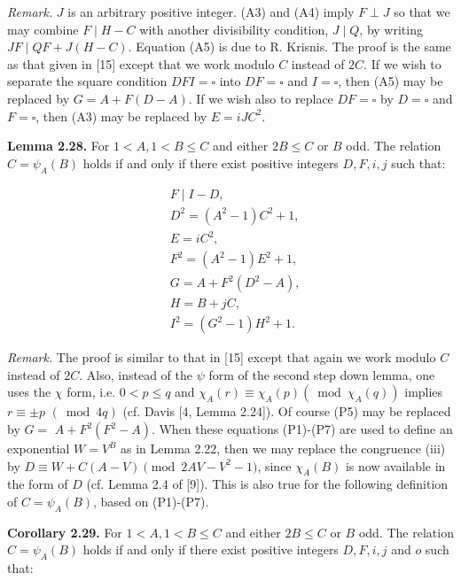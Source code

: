 \documentclass[11pt,a4paper]{article}
\newcommand{\origpage}[1]{\marginnote{\footnotesize\textbf{[#1]}}}
\begin{document}
\noindent\emph{Remark.} $J$ is an arbitrary positive integer. (A3) and (A4) imply $F \perp J$ so that we may combine $F \mid H-C$ with another divisibility condition, $J \mid Q$, by writing $J F \mid Q F+J(H-C)$. Equation (A5) is due to R. Krisnis. The proof is the same as that given in [15] except that we work modulo $C$ instead of $2 C$. If we wish to separate the square condition $D F I=\square$ into $D F=\square$ and $I=\square$, then (A5) may be replaced by $G=A+F(D-A)$. If we wish also to replace $D F=\square$ by $D=\square$ and $F=\square$, then (A3) may be replaced by $E=i J C^{2}$.

\noindent\textbf{Lemma 2.28.}\origpage{560} For $1<A,\allowbreak  1<B \leq C$ and either $2 B \leq C$ or $B$ odd. The relation $C=\psi_{A}(B)$ holds if and only if there exist positive integers $D,\allowbreak  F,\allowbreak  i,\allowbreak  j$ such that:


\begin{align*}
& F \mid I-D,  \tag{P1}\\
& D^{2}=\left(A^{2}-1\right) C^{2}+1,  \tag{P2}\\
& E=i C^{2},  \tag{P3}\\
& F^{2}=\left(A^{2}-1\right) E^{2}+1,  \tag{P4}\\
& G=A+F^{2}\left(D^{2}-A\right),  \tag{P5}\\
& H=B+j C,  \tag{P6}\\
& I^{2}=\left(G^{2}-1\right) H^{2}+1 . \tag{P7}
\end{align*}


\noindent\emph{Remark.} The proof is similar to that in [15] except that again we work modulo $C$ instead of $2 C$. Also, instead of the $\psi$ form of the second step down lemma, one uses the $\chi$ form, i.e. $0<p \leq q$ and $\chi_{A}(r) \equiv \chi_{A}(p)\left(\bmod \chi_{A}(q)\right)$ implies $r \equiv \pm p$ $(\bmod 4 q)$ (cf. Davis [4, Lemma 2.24]). Of course (P5) may be replaced by $G=$ $A+F^{2}\left(F^{2}-A\right)$. When these equations (P1)-(P7) are used to define an exponential $W=V^{B}$ as in Lemma 2.22, then we may replace the congruence (iii) by $D\equiv W+C(A-V)\pmod{2AV-V^{2}-1}$, since $\chi_{A}(B)$ is now available in the form of $D$ (cf. Lemma 2.4 of [9]). This is also true for the following definition of $C=\psi_{A}(B)$, based on (P1)-(P7).

\noindent\textbf{Corollary 2.29.} For $1<A,\allowbreak  1<B \leq C$ and either $2 B \leq C$ or $B$ odd. The relation $C=\psi_{A}(B)$ holds if and only if there exist positive integers $D,\allowbreak  F,\allowbreak  i,\allowbreak  j$ and $o$ such that:
\end{document}

